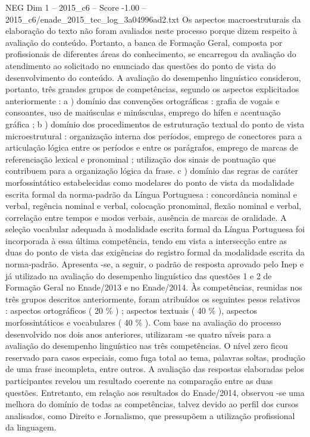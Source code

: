 \begin{textsample}{NEG Dim 1 – 2015\_c6 – Score -1.00 – 2015\_c6/enade\_2015\_tec\_log\_3a04996ad2.txt}
Os aspectos macroestruturais da elaboração do texto não foram avaliados neste processo porque dizem respeito à avaliação do conteúdo.
Portanto, a banca de Formação Geral, composta por profissionais de diferentes áreas do conhecimento, se encarregou da avaliação do atendimento ao solicitado no enunciado das questões do ponto de vista do desenvolvimento do conteúdo.
A avaliação do desempenho linguístico considerou, portanto, três grandes grupos de competências, segundo os aspectos explicitados anteriormente : a ) domínio das convenções ortográficas : grafia de vogais e consoantes, uso de maiúsculas e minúsculas, emprego do hífen e acentuação gráfica ; b ) domínio dos procedimentos de estruturação textual do ponto de vista microestrutural : organização interna dos períodos, emprego de conectores para a articulação lógica entre os períodos e entre os parágrafos, emprego de marcas de referenciação lexical e pronominal ; utilização dos sinais de pontuação que contribuem para a organização lógica da frase. c ) domínio das regras de caráter morfossintático estabelecidas como modelares do ponto de vista da modalidade escrita formal da norma-padrão da Língua Portuguesa : concordância nominal e verbal, regência nominal e verbal, colocação pronominal, flexão nominal e verbal, correlação entre tempos e modos verbais, ausência de marcas de oralidade.
A seleção vocabular adequada à modalidade escrita formal da Língua Portuguesa foi incorporada à essa última competência, tendo em vista a intersecção entre as duas do ponto de vista das exigências do registro formal da modalidade escrita da norma-padrão.
Apresenta -se, a seguir, o padrão de resposta aprovado pelo Inep e já utilizado na avaliação do desempenho linguístico das questões 1 e 2 de Formação Geral no Enade/2013 e no Enade/2014.
Às competências, reunidas nos três grupos descritos anteriormente, foram atribuídos os seguintes pesos relativos : aspectos ortográficos ( 20 \% ) ; aspectos textuais ( 40 \% ), aspectos morfossintáticos e vocabulares ( 40 \% ).
Com base na avaliação do processo desenvolvido nos dois anos anteriores, utilizaram -se quatro níveis para a avaliação do desempenho linguístico nas três competências.
O nível zero ficou reservado para casos especiais, como fuga total ao tema, palavras soltas, produção de uma frase incompleta, entre outros.
A avaliação das respostas elaboradas pelos participantes revelou um resultado coerente na comparação entre as duas questões.
Entretanto, em relação aos resultados do Enade/2014, observou -se uma melhora do domínio de todas as competências, talvez devido ao perfil dos cursos analisados, como Direito e Jornalismo, que pressupõem a utilização profissional da linguagem.

\end{textsample}
